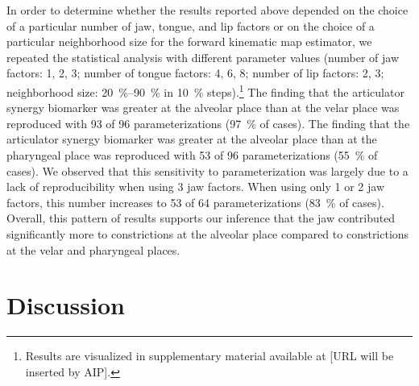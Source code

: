 \documentclass[preprint]{JASAnew}\usepackage[]{graphicx}\usepackage[]{color}
\begin{document}
In order to determine whether the results reported above depended on the choice of a particular number of jaw, tongue, and lip factors or on the choice of a particular neighborhood size for the forward kinematic map estimator, we repeated the statistical analysis with different parameter values (number of jaw factors: 1, 2, 3; number of tongue factors: 4, 6, 8; number of lip factors: 2, 3; neighborhood size: \SIrange{20}{90}{\percent} in \SI{10}{\percent} steps).\footnote{Results are visualized in supplementary material available at [URL will be inserted by AIP].}
%
The finding that the articulator synergy biomarker was greater at the alveolar place than at the velar place was reproduced with 93 of 96 parameterizations (\SI{97}{\percent} of cases).
%
The finding that the articulator synergy biomarker was greater at the alveolar place than at the pharyngeal place was reproduced with 53 of 96 parameterizations (\SI{55}{\percent} of cases).
%
We observed that this sensitivity to parameterization was largely due to a lack of reproducibility when using 3 jaw factors. 
%
When using only 1 or 2 jaw factors, this number increases to 53 of 64 parameterizations (\SI{83}{\percent} of cases).
%
Overall, this pattern of results supports our inference that the jaw contributed significantly more to constrictions at the alveolar place compared to constrictions at the velar and pharyngeal places.









\section{Discussion}
\end{document}
